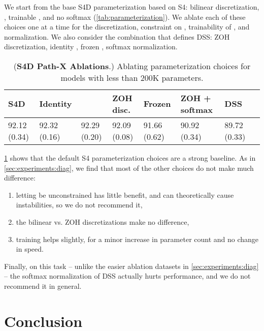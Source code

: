 \documentclass{article}
\begin{document}
We start from the base S4D parameterization based on S4: bilinear discretization,  , trainable , and no softmax (\cref{tab:parameterization}).
We ablate each of these choices one at a time for the discretization, constraint on , trainability of , and normalization.
We also consider the combination that defines DSS: ZOH discretization, identity , frozen , softmax normalization.

\begin{table}[!t]
  \caption{(\textbf{S4D Path-X Ablations}.) Ablating parameterization choices for models with less than 200K parameters.}
    \centering
    \begin{tabular}{@{}llllllll@{}}
        \toprule
        \textbf{S4D}    & Identity  &   & ZOH disc.    & Frozen  & ZOH + softmax & \textbf{DSS} \\
        \midrule
          92.12 (0.34) & 92.32 (0.16)                     & 92.29 (0.20)                              & 92.09 (0.08) & 91.66 (0.62)        & 90.92 (0.34)  & 89.72 (0.33) \\
        \bottomrule
    \end{tabular}
    \label{tab:pathx-ablation}
\end{table}

\cref{tab:pathx-ablation} shows that the default S4 parameterization choices are a strong baseline.
As in \cref{sec:experiments:diag}, we find that most of the other choices do not make much difference:
\begin{enumerate}[label=(\roman*),itemsep=0pt]\item letting  be unconstrained has little benefit, and can theoretically cause instabilities, so we do not recommend it,
  \item the bilinear vs. ZOH discretizations make no difference,
  \item training  helps slightly, for a minor increase in parameter count and no change in speed.
\end{enumerate}
Finally, on this task -- unlike the easier ablation datasets in \cref{sec:experiments:diag} --
the softmax normalization of DSS actually hurts performance, and we do not recommend it in general.



 
\section{Conclusion}
\end{document}
